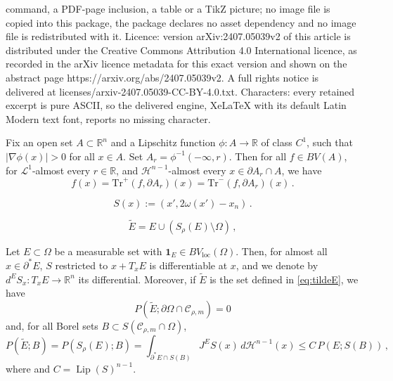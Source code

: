 \documentclass[10pt,a4paper]{amsart}
\newcommand{\Hau}{{\mathcal H}} %
\newcommand{\Lip}{\mathop{\mathrm{Lip}}}
\newcommand{\R}{\mathbb{R}}
\newcommand{\Tr}{{\mathrm{Tr}}}
\newcommand{\cC}{\mathcal{C}}
\newcommand{\cL}{\mathcal{L}}
\newcommand{\ch}{\mathbf{1}}
\newcommand{\de}{\partial}
\newcommand{\loc}{\mathop{\mathrm{loc}}}
\newcommand{\p}{P}
\newcommand{\ra}{\rightarrow}
\begin{document}
command, a PDF-page inclusion, a table or a TikZ picture; no image file is copied into this package, the package declares no asset dependency and no image file is redistributed with it. Licence: version arXiv:2407.05039v2 of this article is distributed under the Creative Commons Attribution 4.0 International licence, as recorded in the arXiv licence metadata for this exact version and shown on the abstract page https://arxiv.org/abs/2407.05039v2. A full rights notice is delivered at licenses/arxiv-2407.05039-CC-BY-4.0.txt. Characters: every retained excerpt is pure ASCII, so the delivered engine, XeLaTeX with its default Latin Modern text font, reports no missing character.
\begin{lemma} \label{lem:faetrace}
Fix an open set $A \subset \R^{n}$ and a Lipschitz function $\phi:A\to \R$ of class $C^{1}$, such that $|\nabla \phi(x)|>0$ for all $x\in A$. Set $A_{r} = \phi^{-1}(-\infty,r)$. Then for all $f \in BV(A)$, for $\cL^{1}$-almost every $r\in \R$, and $\Hau^{n-1}$-almost every $x \in \de A_{r}\cap A$, we have
\begin{equation}\label{eq:fxequaltrace}
f(x) = \Tr^{+} (f, \de A_{r})(x) = \Tr^{-} (f, \de A_{r})(x) \, .
\end{equation}
\end{lemma}

\begin{equation}\label{eq:Ssymmetry}
S(x) := (x', 2 \omega(x') - x_n) \, .
\end{equation}

\begin{equation}\label{eq:tildeE}
\tilde E = E \cup (S_{\rho}(E)\setminus \Omega)\,,
\end{equation}

\begin{lemma} \label{lem:boundS}
Let $E \subset \Omega$ be a measurable set with $\ch_E \in BV_{\loc}(\Omega)$. Then, for almost all $x \in \de^\ast E$, $S$ restricted to $x+T_{x}E$ is differentiable at $x$, and we denote by $d^E S_x: T_x E \ra \R^{n}$ its differential. Moreover, if $\tilde E$ is the set defined in \eqref{eq:tildeE}, we have 
\begin{equation}\label{eq:pEtildezero}
\p(\tilde E;\de\Omega\cap \cC_{\rho,m}) = 0
\end{equation}
and, for all Borel sets $B \subset S(\cC_{\rho,m} \cap \Omega)$, 
\begin{equation} \label{eq:perim}
\p(\tilde E;B) = \p(S_{\rho}(E);B) = \int_{\de^\ast E \cap S(B)} J^E S (x) \, d \Hau^{n-1}(x) \le C\,\p(E;S(B)) \, ,
\end{equation}
where  and $C = \Lip(S)^{n-1}$.
\end{lemma}
\end{document}
